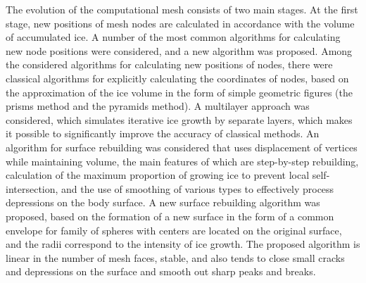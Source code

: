\documentclass[
11pt,%
tightenlines,%
twoside,%
onecolumn,%
nofloats,%
nobibnotes,%
nofootinbib,%
superscriptaddress,%
noshowpacs,%
centertags]%
{revtex4-2}
\begin{document}
The evolution of the computational mesh consists of two main stages.
At the first stage, new positions of mesh nodes are calculated in accordance with the volume of accumulated ice.
A number of the most common algorithms for calculating new node positions were considered, and a new algorithm was proposed.
Among the considered algorithms for calculating new positions of nodes, there were classical algorithms for explicitly calculating the coordinates of nodes, based on the approximation of the ice volume in the form of simple geometric figures (the prisms method and the pyramids method).
A multilayer approach was considered, which simulates iterative ice growth by separate layers, which makes it possible to significantly improve the accuracy of classical methods.
An algorithm for surface rebuilding was considered that uses displacement of vertices while maintaining volume, the main features of which are step-by-step rebuilding, calculation of the maximum proportion of growing ice to prevent local self-intersection, and the use of smoothing of various types to effectively process depressions on the body surface.
A new surface rebuilding algorithm was proposed, based on the formation of a new surface in the form of a common envelope for family of spheres with centers are located on the original surface, and the radii correspond to the intensity of ice growth.
The proposed algorithm is linear in the number of mesh faces, stable, and also tends to close small cracks and depressions on the surface and smooth out sharp peaks and breaks.
\end{document}
